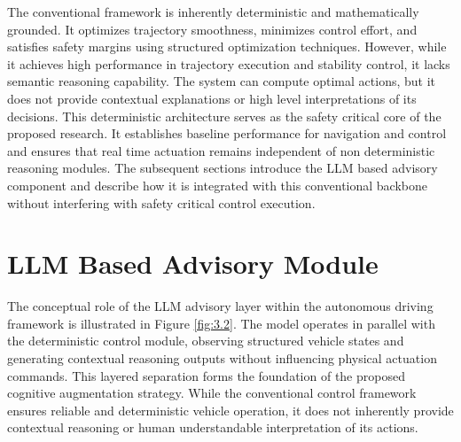 \documentclass[a4paper,12pt,one side]{report}
\theoremstyle{definition}
\begin{document}
\begin{itemize}
The conventional framework is inherently deterministic and mathematically grounded. It optimizes trajectory smoothness, minimizes control effort, and satisfies safety margins using structured optimization techniques. However, while it achieves high performance in trajectory execution and stability control, it lacks semantic reasoning capability. The system can compute optimal actions, but it does not provide contextual explanations or high level interpretations of its decisions.
This deterministic architecture serves as the safety critical core of the proposed research. It establishes baseline performance for navigation and control and ensures that real time actuation remains independent of non deterministic reasoning modules. The subsequent sections introduce the LLM based advisory component and describe how it is integrated with this conventional backbone without interfering with safety critical control execution.
\section{LLM Based Advisory Module}
The conceptual role of the LLM \cite{yang2023llm4drive} advisory layer within the autonomous driving framework is illustrated in Figure \ref{fig:3.2}. The model operates in parallel with the deterministic control module, observing structured vehicle states and generating contextual reasoning outputs without influencing physical actuation commands. This layered separation forms the foundation of the proposed cognitive augmentation strategy. While the conventional control framework ensures reliable and deterministic vehicle operation, it does not inherently provide contextual reasoning or human understandable interpretation of its actions.


\end{itemize}
\end{document}
